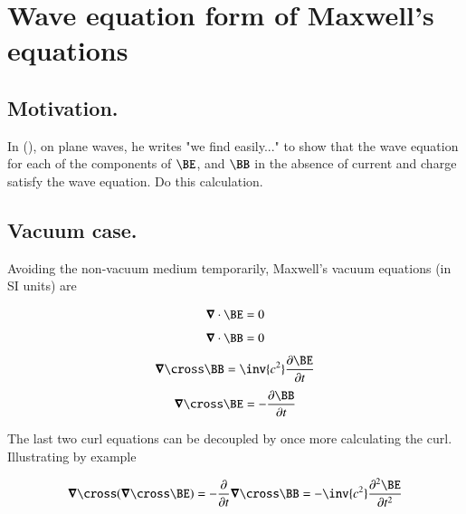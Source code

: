 %

\chapter{Wave equation form of Maxwell's equations}\label{chap:emVacWave}
\date{ June 21, 2009.  $RCSfile: emVacWave.tex,v $ Last $Revision: 1.5 $ $Date: 2009/07/11 05:49:02 $ }

\beginArtWithToc

\section{Motivation.}

In (\citep{jackson1975cew}), on plane waves, he writes "we find easily..." to show that the wave equation for each of the components of $\BE$, and $\BB$ in the absence of current and charge satisfy the wave equation.  Do this calculation.

\section{Vacuum case.}

Avoiding the non-vacuum medium temporarily, Maxwell's vacuum equations (in SI units) are

\begin{align}\label{eqn:emVacWave:divE}
\spacegrad \cdot \BE = 0
\end{align}
\begin{align}\label{eqn:emVacWave:divB}
\spacegrad \cdot \BB = 0
\end{align}
\begin{align}\label{eqn:emVacWave:curlB}
\spacegrad \cross \BB = \inv{c^2} \frac{\partial \BE}{\partial t}
\end{align}
\begin{align}\label{eqn:emVacWave:curlE}
\spacegrad \cross \BE = -\frac{\partial \BB}{\partial t}
\end{align}

The last two curl equations can be decoupled by once more calculating the curl.  Illustrating by example

\begin{align}\label{eqn:emVacWave:curlCurlE}
\spacegrad \cross (\spacegrad \cross \BE) = -\frac{\partial }{\partial t} \spacegrad \cross \BB = -\inv{c^2} \frac{\partial^2 \BE}{\partial t^2}
\end{align}

